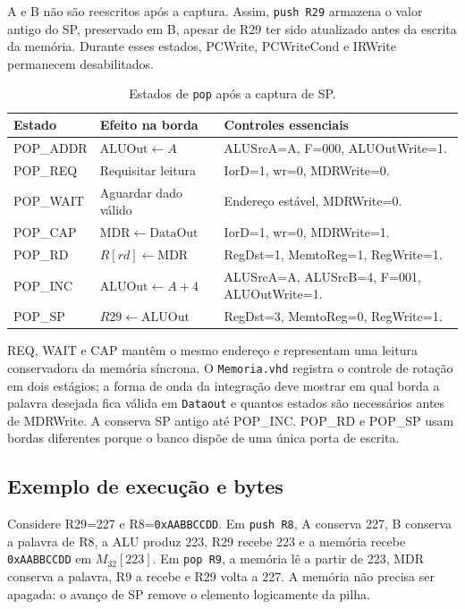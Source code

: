 A e B não são reescritos após a captura. Assim, \texttt{push R29} armazena o valor antigo do SP, preservado em B, apesar de R29 ter sido atualizado antes da escrita da memória. Durante esses estados, PCWrite, PCWriteCond e IRWrite permanecem desabilitados.

\begin{table}[H]\centering\small
\caption{Estados de \texttt{pop} após a captura de SP.}\label{tab:pop-estados}
\begin{tabularx}{\linewidth}{@{}p{2.5cm}p{4cm}X@{}}\toprule
Estado & Efeito na borda & Controles essenciais \\\midrule
POP\_ADDR & $\mathrm{ALUOut}\gets A$ & ALUSrcA=A, F=000, ALUOutWrite=1. \\
POP\_REQ & Requisitar leitura & IorD=1, wr=0, MDRWrite=0. \\
POP\_WAIT & Aguardar dado válido & Endereço estável, MDRWrite=0. \\
POP\_CAP & $\mathrm{MDR}\gets\mathrm{DataOut}$ & IorD=1, wr=0, MDRWrite=1. \\
POP\_RD & $R[rd]\gets\mathrm{MDR}$ & RegDst=1, MemtoReg=1, RegWrite=1. \\
POP\_INC & $\mathrm{ALUOut}\gets A+4$ & ALUSrcA=A, ALUSrcB=4, F=001, ALUOutWrite=1. \\
POP\_SP & $R29\gets\mathrm{ALUOut}$ & RegDst=3, MemtoReg=0, RegWrite=1. \\\bottomrule
\end{tabularx}
\end{table}

REQ, WAIT e CAP mantêm o mesmo endereço e representam uma leitura conservadora da memória síncrona. O \texttt{Memoria.vhd} registra o controle de rotação em dois estágios; a forma de onda da integração deve mostrar em qual borda a palavra desejada fica válida em \texttt{Dataout} e quantos estados são necessários antes de MDRWrite. A conserva SP antigo até POP\_INC. POP\_RD e POP\_SP usam bordas diferentes porque o banco dispõe de uma única porta de escrita.

\subsection{Exemplo de execução e bytes}\label{subsec:exemplo-pilha}

Considere R29=227 e R8=\texttt{0xAABBCCDD}. Em \texttt{push R8}, A conserva 227, B conserva a palavra de R8, a ALU produz 223, R29 recebe 223 e a memória recebe \texttt{0xAABBCCDD} em $M_{32}[223]$. Em \texttt{pop R9}, a memória lê a partir de 223, MDR conserva a palavra, R9 a recebe e R29 volta a 227. A memória não precisa ser apagada: o avanço de SP remove o elemento logicamente da pilha.

